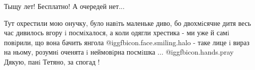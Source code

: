  
 
 
 
 

Тыщу лет! Бесплатно! А очередей нет...


Тут охрестили мою онучку, було навiть маленьке диво, бо двохмiсячне дитя весь
час дивилось вгору i посмiхалося, а коли одягли хрестика - ми уже й самi
повiрили, що вона бачить янгола  @igg{fbicon.face.smiling.halo} - таке лице i вираз на ньому, розумнi
оченята i неймовiрна посмiшка ...  @igg{fbicon.hands.pray}  Дякую, панi Тетяно, за спогад !
